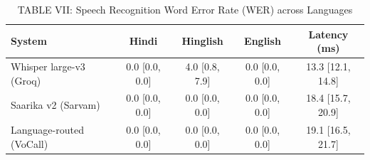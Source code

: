 \begin{table}[t]
\centering
\caption{TABLE VII: Speech Recognition Word Error Rate (WER) across Languages}
\label{tab:speech_wer}
\begin{tabular}{lcccc}
\toprule
System & Hindi & Hinglish & English & Latency (ms) \\
\midrule
Whisper large-v3 (Groq) & 0.0 [0.0, 0.0] & 4.0 [0.8, 7.9] & 0.0 [0.0, 0.0] & 13.3 [12.1, 14.8] \\
Saarika v2 (Sarvam) & 0.0 [0.0, 0.0] & 0.0 [0.0, 0.0] & 0.0 [0.0, 0.0] & 18.4 [15.7, 20.9] \\
Language-routed (VoCall) & 0.0 [0.0, 0.0] & 0.0 [0.0, 0.0] & 0.0 [0.0, 0.0] & 19.1 [16.5, 21.7] \\
\bottomrule
\end{tabular}
\end{table}